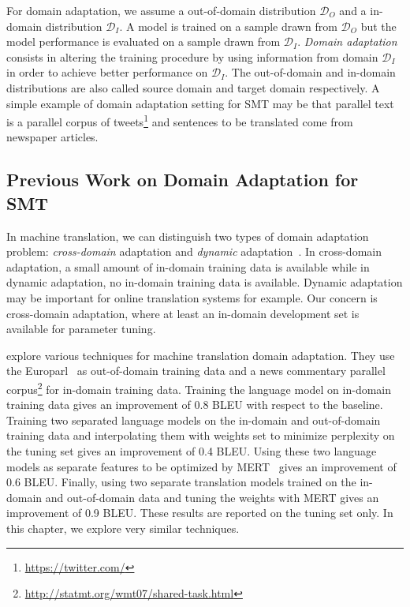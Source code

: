 For domain adaptation, we assume a out-of-domain distribution
$\mathcal{D}_O$ and a in-domain distribution $\mathcal{D}_I$.
A model is trained on
a sample drawn from $\mathcal{D}_O$ but the model performance
is evaluated on a sample drawn from $\mathcal{D}_I$.
\emph{Domain adaptation} consists in altering the training procedure
by using information from domain
$\mathcal{D}_I$ in order to achieve better performance on $\mathcal{D}_I$.
The out-of-domain and in-domain distributions are also called
source domain and target domain respectively.
A simple example of domain adaptation setting for SMT may be that
parallel text is a parallel corpus of
tweets\footnote{\url{https://twitter.com/}} and sentences to be translated
come from newspaper articles.

\subsection{Previous Work on Domain Adaptation for SMT}
\label{sec:domainAdaptationSMTrelatedWork}



In machine translation, we can distinguish two types of domain
adaptation problem: \emph{cross-domain} adaptation and \emph{dynamic}
adaptation~\citep{foster-kuhn:2007:WMT}. In cross-domain adaptation,
a small amount of in-domain training data is available while
in dynamic adaptation, no in-domain training data is available.
Dynamic adaptation may be important for online translation systems for example.
Our concern is cross-domain adaptation, where at least an in-domain
development set is available for parameter tuning.

\citet{koehn-schroeder:2007:WMT} explore various techniques for
machine translation domain adaptation. They use the
Europarl~\citep{koehn:2005:MTSummit} as out-of-domain
training data and a news commentary parallel
corpus\footnote{\url{http://statmt.org/wmt07/shared-task.html}}
for in-domain training data. Training the language model
on in-domain training data gives an improvement of 0.8 BLEU
with respect to the baseline. Training two separated language models
on the in-domain and out-of-domain training data and interpolating
them with weights set to minimize perplexity on the tuning set
gives an improvement of 0.4 BLEU. Using these two language models
as separate features to be optimized by MERT~\citep{och:2003:ACL}
gives an improvement of 0.6 BLEU. Finally, using two separate
translation models trained on the in-domain and out-of-domain
data and tuning the weights with MERT gives an improvement
of 0.9 BLEU. These results are reported on the tuning set only.
In this chapter, we explore very similar techniques.

